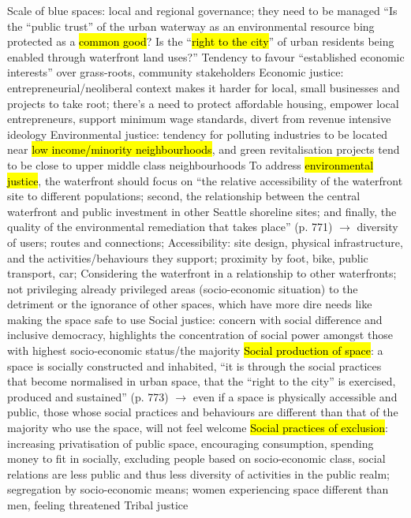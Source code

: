 \documentclass{article}
\begin{document}
\begin{outline}
	\1 Scale of blue spaces: local and regional governance; they need to be managed
		\2 ``Is the ``public trust'' of the urban waterway as an environmental resource bing protected as a \hl{common good}? Is the ``\hl{right to the city}'' of urban residents being enabled through waterfront land uses?''
		\2 Tendency to favour ``established economic interests'' over grass-roots, community stakeholders
	\1 Economic justice: entrepreneurial/neoliberal context makes it harder for local, small businesses and projects to take root; there's a need to protect affordable housing, empower local entrepreneurs, support minimum wage standards, divert from revenue intensive ideology
	\1 Environmental justice: tendency for polluting industries to be located near \hl{low income/minority neighbourhoods}, and green revitalisation projects tend to be close to upper middle class neighbourhoods
		\2 To address \hl{environmental justice}, the waterfront should focus on ``the relative accessibility of the waterfront site to different populations; second, the relationship between the central waterfront and public investment in other Seattle shoreline sites; and finally, the quality of the environmental remediation that takes place'' (p. 771) $\rightarrow$ diversity of users; routes and connections;
		\2 Accessibility: site design, physical infrastructure, and the activities/behaviours they support; proximity by foot, bike, public transport, car; 
		\2 Considering the waterfront in a relationship to other waterfronts; not privileging already privileged areas (socio-economic situation) to the detriment or the ignorance of other spaces, which have more dire needs like making the space safe to use 
	\1 Social justice: concern with social difference and inclusive democracy, highlights the concentration of social power amongst those with highest socio-economic status/the majority
		\2 \hl{Social production of space}: a space is socially constructed and inhabited, ``it is through the social practices that become normalised in urban space, that the ``right to the city'' is exercised, produced and sustained'' (p. 773) $\rightarrow$ even if a space is physically accessible and public, those whose social practices and behaviours are different than that of the majority who use the space, will not feel welcome
		\2 \hl{Social practices of exclusion}: increasing privatisation of public space, encouraging consumption, spending money to fit in socially, excluding people based on socio-economic class, social relations are less public and thus less diversity of activities in the public realm; segregation by socio-economic means; women experiencing space different than men, feeling threatened
	\1 Tribal justice
\end{outline}
\end{document}
